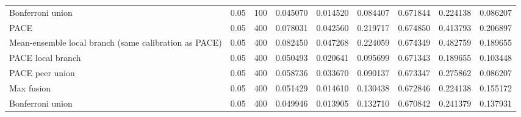 \begin{tabular}{lllllllll}
Bonferroni union & 0.05 & 100 & 0.045070 & 0.014520 & 0.084407 & 0.671844 & 0.224138 & 0.086207 \\
PACE & 0.05 & 400 & 0.078031 & 0.042560 & 0.219717 & 0.674850 & 0.413793 & 0.206897 \\
Mean-ensemble local branch (same calibration as PACE) & 0.05 & 400 & 0.082450 & 0.047268 & 0.224059 & 0.674349 & 0.482759 & 0.189655 \\
PACE local branch & 0.05 & 400 & 0.050493 & 0.020641 & 0.095699 & 0.671343 & 0.189655 & 0.103448 \\
PACE peer union & 0.05 & 400 & 0.058736 & 0.033670 & 0.090137 & 0.673347 & 0.275862 & 0.086207 \\
Max fusion & 0.05 & 400 & 0.051429 & 0.014610 & 0.130438 & 0.672846 & 0.224138 & 0.155172 \\
Bonferroni union & 0.05 & 400 & 0.049946 & 0.013905 & 0.132710 & 0.670842 & 0.241379 & 0.137931 \\
\bottomrule
\end{tabular}
